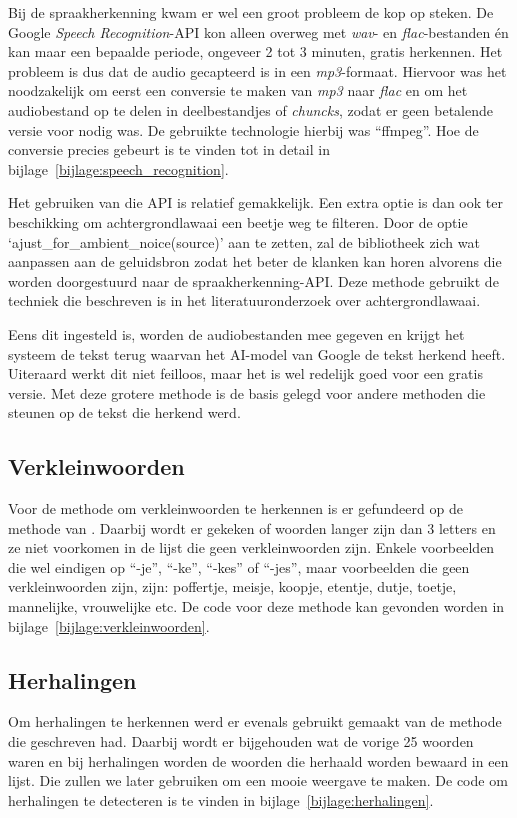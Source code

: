 Bij de spraakherkenning kwam er wel een groot probleem de kop op steken. De Google \textit{Speech Recognition}-API kon alleen overweg met \textit{wav}- en \textit{flac}-bestanden én kan maar een bepaalde periode, ongeveer 2 tot 3 minuten, gratis herkennen. Het probleem is dus dat de audio gecapteerd is in een \textit{mp3}-formaat. Hiervoor was het noodzakelijk om eerst een conversie te maken van \textit{mp3} naar \textit{flac} en om het audiobestand op te delen in deelbestandjes of \textit{chuncks}, zodat er geen betalende versie voor nodig was. De gebruikte technologie hierbij was ``ffmpeg''. Hoe de conversie precies gebeurt is te vinden tot in detail in bijlage~\ref{bijlage:speech_recognition}.

Het gebruiken van die API is relatief gemakkelijk. Een extra optie is dan ook ter beschikking om achtergrondlawaai een beetje weg te filteren. Door de optie `ajust\_for\_ambient\_noice(source)' aan te zetten, zal de bibliotheek zich wat aanpassen aan de geluidsbron zodat het beter de klanken kan horen alvorens die worden doorgestuurd naar de spraakherkenning-API. Deze methode gebruikt de techniek die beschreven is in het literatuuronderzoek over achtergrondlawaai.

Eens dit ingesteld is, worden de audiobestanden mee gegeven en krijgt het systeem de tekst terug waarvan het AI-model van Google de tekst herkend heeft. Uiteraard werkt dit niet feilloos, maar het is wel redelijk goed voor een gratis versie. Met deze grotere methode is de basis gelegd voor andere methoden die steunen op de tekst die herkend werd.

\subsection{Verkleinwoorden}
Voor de methode om verkleinwoorden te herkennen is er gefundeerd op de methode van \textcite{Standaert2021}. Daarbij wordt er gekeken of woorden langer zijn dan 3 letters en ze niet voorkomen in de lijst die geen verkleinwoorden zijn. Enkele voorbeelden die wel eindigen op ``-je'', ``-ke'', ``-kes'' of ``-jes'', maar voorbeelden die geen verkleinwoorden zijn, zijn: poffertje, meisje, koopje, etentje, dutje, toetje, mannelijke, vrouwelijke etc. De code voor deze methode kan gevonden worden in bijlage~\ref{bijlage:verkleinwoorden}.

\subsection{Herhalingen}
Om herhalingen te herkennen werd er evenals gebruikt gemaakt van de methode die \textcite{Standaert2021} geschreven had. Daarbij wordt er bijgehouden wat de vorige 25 woorden waren en bij herhalingen worden de woorden die herhaald worden bewaard in een lijst. Die zullen we later gebruiken om een mooie weergave te maken.
De code om herhalingen te detecteren is te vinden in bijlage~\ref{bijlage:herhalingen}.

